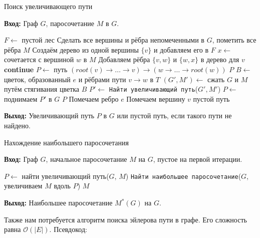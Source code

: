\begin{algorithm}[H]
    \caption{Поиск увеличивающего пути}
    \textbf{Вход:} Граф $G$, паросочетание $M$ в $G$.
    \begin{algorithmic}[1]
        \State $F \gets$ пустой лес
        \State Сделать все вершины и рёбра непомеченными в $G$, пометить все рёбра $M$
        \State Создаём дерево из одной вершины $\{v\}$ и добавляем его в $F$
        \EndFor
        \State $x \gets$ сочетается с вершиной $w$ в $M$
        \State Добавляем рёбра $\{v, w\}$ и $\{w, x\}$ в дерево для $v$
        \State \textbf{continue}
        \Else
        \State $P \gets$ путь $(root(v) \to \dots \to v) \to (w \to \dots \to root(w))$
        \State \Return $P$
        \Else
        \State $B \gets$ цветок, образованный $e$ и рёбрами пути $v \to w$ в $T$
        \State $(G', M') \gets$ сжать $G$ и $M$ путём стягивания цветка $B$
        \State $P' \gets$ \texttt{Найти увеличивающий путь}($G', M'$)
        \State $P \gets$ поднимаем $P'$ в $G$
        \State \Return $P$
        \EndIf
        \EndIf
        \State Помечаем ребро $e$
        \EndWhile
        \State Помечаем вершину $v$
        \EndWhile
        \State \Return пустой путь
    \end{algorithmic}
    \textbf{Выход:} Увеличивающий путь $P$ в $G$ или пустой путь, если такого пути не найдено.
\end{algorithm}

\begin{algorithm}[H]
    \caption{Нахождение наибольшего паросочетания}
    \textbf{Вход:} Граф $G$, начальное паросочетание $M$ на $G$, пустое на первой итерации.
    \begin{algorithmic}[1]
        \State $P \gets$ найти увеличивающий путь($G$, $M$)
        \State \Return \texttt{Найти наибольшее паросочетание}($G$, увеличиваем $M$ вдоль $P$)
        \Else
        \State \Return $M$
        \EndIf
    \end{algorithmic}
    \textbf{Выход:} Наибольшее паросочетание $M^*(G)$ на $G$.
\end{algorithm}


Также нам потребуется алгоритм поиска эйлерова пути в графе. Его сложность равна $\mathcal{O}(|E|)$. Псевдокод:

